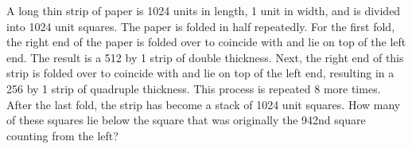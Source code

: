 A long thin strip of paper is 1024 units in length, 1 unit in width, and is divided into 1024 unit squares. The paper is folded in half repeatedly. For the first fold, the right end of the paper is folded over to coincide with and lie on top of the left end. The result is a 512 by 1 strip of double thickness. Next, the right end of this strip is folded over to coincide with and lie on top of the left end, resulting in a 256 by 1 strip of quadruple thickness. This process is repeated 8 more times. After the last fold, the strip has become a stack of 1024 unit squares. How many of these squares lie below the square that was originally the 942nd square counting from the left?
